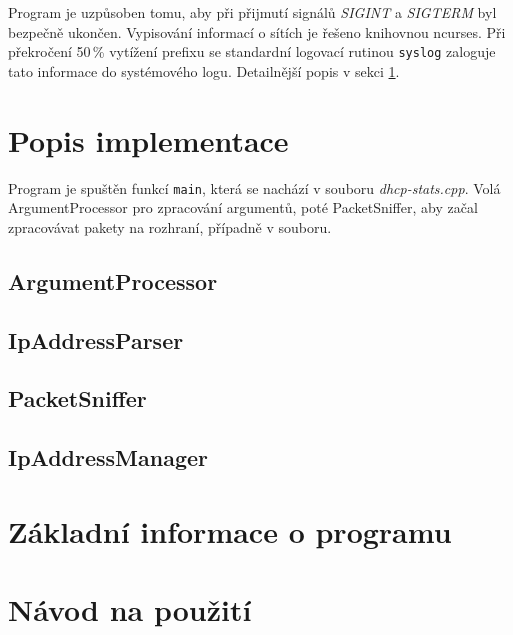 \documentclass[a4paper, 11pt, hidelinks]{article}
\begin{document}
Program je uzpůsoben tomu, aby při přijmutí signálů \emph{SIGINT} a \emph{SIGTERM} byl bezpečně ukončen. 
Vypisování informací o sítích je řešeno knihovnou ncurses. 
Při překročení 50\,\% vytížení prefixu se standardní logovací rutinou \texttt{syslog} zaloguje tato informace do systémového logu.
Detailnější popis v sekci \ref{3_popis}.

\section{Popis implementace}\label{3_popis}
Program je spuštěn funkcí \texttt{main}, která se nachází v souboru \emph{dhcp-stats.cpp}. 
Volá ArgumentProcessor pro zpracování argumentů, poté PacketSniffer, aby začal zpracovávat pakety na rozhraní, případně v souboru.

\subsection{ArgumentProcessor}\label{3_1_ap}

\subsection{IpAddressParser}\label{3_2_ipap}

\subsection{PacketSniffer}\label{3_3_ps}

\subsection{IpAddressManager}\label{3_4_ipam}

\section{Základní informace o programu}\label{4_zakladni_info}

\section{Návod na použití}\label{5_navod}

\newpage


\end{document}
